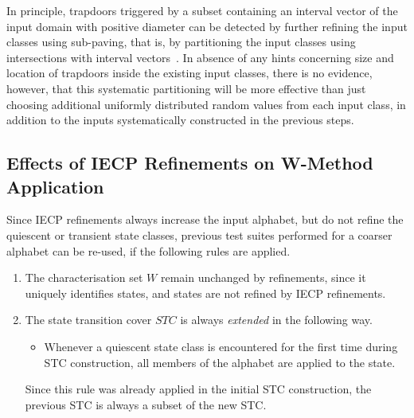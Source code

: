 In principle, trapdoors triggered by a subset containing an interval vector of the input domain with positive diameter can be detected by further refining the input classes using sub-paving, that is, by partitioning the input classes using intersections with interval vectors~\cite{jaulin2001}.
In absence of any hints concerning size and location of trapdoors inside the existing input classes,
there is no evidence, however, that this systematic partitioning will be more effective than just choosing additional uniformly distributed random values from each input class, in addition to the inputs systematically constructed in the previous steps. 




\subsection{Effects of IECP Refinements on W-Method Application}

Since  IECP refinements always increase the input alphabet, but do not refine the quiescent or transient state classes, previous test suites performed for a coarser alphabet can be re-used, if the following rules are applied.
\begin{enumerate}
\item The characterisation set $W$ remain unchanged by refinements, since it uniquely identifies states, and states are not refined by IECP refinements.

\item The state transition cover $STC$ is always {\it extended} in the following way.
\begin{itemize}
\item Whenever a quiescent state class is encountered for the first time during STC construction, all members of the alphabet are applied to the state.
\end{itemize}
Since this rule was already applied in the initial STC construction, the previous STC is always a subset of the new STC.
\end{enumerate}


